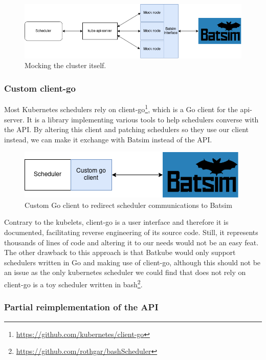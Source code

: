 \begin{figure}[h]
	\centering
	\includegraphics[width=\textwidth]{../imgs/architecture-as-kubelets.png}
	\caption{Mocking the cluster itself.}
	\label{fig:mock_nodes}
\end{figure}

\subsubsection{Custom client-go}

Most Kubernetes schedulers rely on
client-go\footnote{\url{https://github.com/kubernetes/client-go}}, which is a Go
client for the api-server. It is a library implementing various tools to help
schedulers converse with the API. By altering this client and patching
schedulers so they use our client instead, we can make it exchange with Batsim
instead of the API. 

\begin{figure}[h]
	\centering
	\includegraphics[scale=0.8]{../imgs/custom-go-client.png}
	\caption{Custom Go client to redirect scheduler communications to Batsim}
	\label{fig:custom-go-client}
\end{figure}

Contrary to the kubelets, client-go is a user interface and therefore it is
documented, facilitating reverse engineering of its source code. Still, it
represents thousands of lines of code and altering it to our needs would not be
an easy feat.  The other drawback to this approach is that Batkube would only
support schedulers written in Go and making use of client-go, although this
should not be an issue as the only kubernetes scheduler we could find that does
not rely on client-go is a toy scheduler written in
bash\footnote{\url{https://github.com/rothgar/bashScheduler}}.

\subsubsection{Partial reimplementation of the API}

